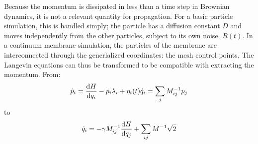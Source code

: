 Because the momentum is dissipated in less than a time step in Brownian dynamics, it is not a relevant quantity for propagation.
For a basic particle simulation, this is handled simply; the particle has a diffusion constant $D$ and moves independently from the other particles, subject to its own noise, $R(t)$.
In a continuum membrane simulation, the particles of the membrane are interconnected through the generlalized coordinates: the mesh control points.
The Langevin equations can thus be transformed to be compatible with extracting the momentum.
From:
\begin{equation}
\dot{p}_i = \frac{\textrm{d} H}{\textrm{d} q_i} - \dot{p}_i \lambda_i + \eta_i(t) \nonumber \\
\dot{q}_i = \sum_j M_{ij}^{-1} p_j
\end{equation}
to
\begin{equation}
\dot{q}_i = -\gamma M_{ij}^{-1} \frac{\textrm{d} H}{\textrm{d} q_j} + \sum_{ij} M^{-1} \sqrt{2} 
\end{equation}














